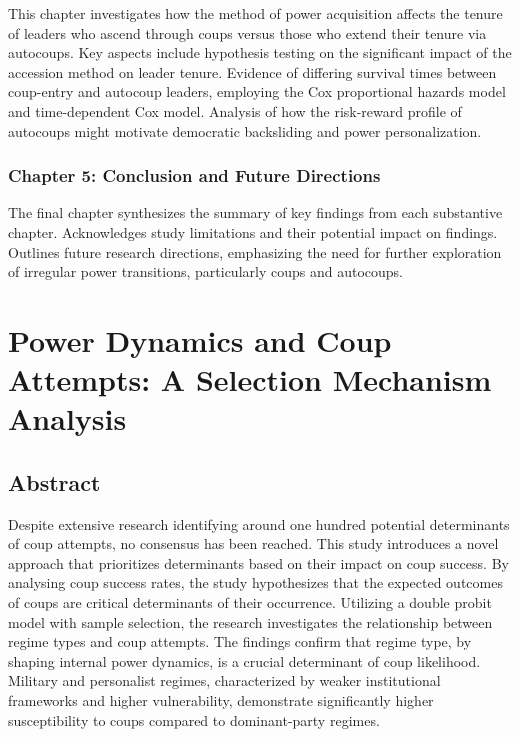 \documentclass[
  12pt,
]{report}
\begin{document}
This chapter investigates how the method of power acquisition affects
the tenure of leaders who ascend through coups versus those who extend
their tenure via autocoups. Key aspects include hypothesis testing on
the significant impact of the accession method on leader tenure.
Evidence of differing survival times between coup-entry and autocoup
leaders, employing the Cox proportional hazards model and time-dependent
Cox model. Analysis of how the risk-reward profile of autocoups might
motivate democratic backsliding and power personalization.

\subsection*{Chapter 5: Conclusion and Future
Directions}\label{chapter-5-conclusion-and-future-directions}

The final chapter synthesizes the summary of key findings from each
substantive chapter. Acknowledges study limitations and their potential
impact on findings. Outlines future research directions, emphasizing the
need for further exploration of irregular power transitions,
particularly coups and autocoups.

\chapter{Power Dynamics and Coup Attempts: A Selection Mechanism
Analysis}\label{sec-chapter2}

\section*{Abstract}\label{abstract-1}

Despite extensive research identifying around one hundred potential
determinants of coup attempts, no consensus has been reached. This study
introduces a novel approach that prioritizes determinants based on their
impact on coup success. By analysing coup success rates, the study
hypothesizes that the expected outcomes of coups are critical
determinants of their occurrence. Utilizing a double probit model with
sample selection, the research investigates the relationship between
regime types and coup attempts. The findings confirm that regime type,
by shaping internal power dynamics, is a crucial determinant of coup
likelihood. Military and personalist regimes, characterized by weaker
institutional frameworks and higher vulnerability, demonstrate
significantly higher susceptibility to coups compared to dominant-party
regimes.
\end{document}
